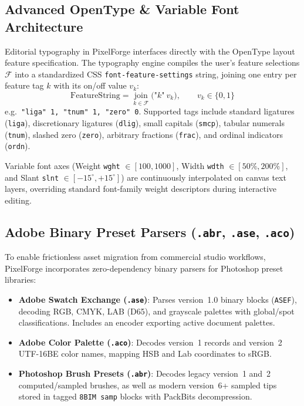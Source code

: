 \documentclass[10pt,journal,compsoc]{IEEEtran}
\begin{document}
\subsection{Advanced OpenType \& Variable Font Architecture}
Editorial typography in PixelForge interfaces directly with the OpenType layout feature specification. The typography engine compiles the user's feature selections $\mathcal{F}$ into a standardized CSS \texttt{font-feature-settings} string, joining one entry per feature tag $k$ with its on/off value $v_k$:
\begin{equation}
\text{FeatureString} = \operatorname*{join}_{k \in \mathcal{F}} \big( \texttt{"}k\texttt{"}\ v_k \big), \qquad v_k \in \{0, 1\}
\end{equation}
e.g.\ \texttt{"liga" 1, "tnum" 1, "zero" 0}. Supported tags include standard ligatures (\texttt{liga}), discretionary ligatures (\texttt{dlig}), small capitals (\texttt{smcp}), tabular numerals (\texttt{tnum}), slashed zero (\texttt{zero}), arbitrary fractions (\texttt{frac}), and ordinal indicators (\texttt{ordn}).

Variable font axes (Weight \texttt{wght} $\in [100, 1000]$, Width \texttt{wdth} $\in [50\%, 200\%]$, and Slant \texttt{slnt} $\in [-15^\circ, +15^\circ]$) are continuously interpolated on canvas text layers, overriding standard font-family weight descriptors during interactive editing.

\subsection{Adobe Binary Preset Parsers (\texttt{.abr}, \texttt{.ase}, \texttt{.aco})}
To enable frictionless asset migration from commercial studio workflows, PixelForge incorporates zero-dependency binary parsers for Photoshop preset libraries:

\begin{itemize}
    \item \textbf{Adobe Swatch Exchange (\texttt{.ase})}: Parses version~1.0 binary blocks (\texttt{ASEF}), decoding RGB, CMYK, LAB (D65), and grayscale palettes with global/spot classifications. Includes an encoder exporting active document palettes.
    \item \textbf{Adobe Color Palette (\texttt{.aco})}: Decodes version~1 records and version~2 UTF-16BE color names, mapping HSB and Lab coordinates to sRGB.
    \item \textbf{Photoshop Brush Presets (\texttt{.abr})}: Decodes legacy version~1 and~2 computed/sampled brushes, as well as modern version~6+ sampled tips stored in tagged \texttt{8BIM samp} blocks with PackBits decompression.
\end{itemize}
\end{document}
